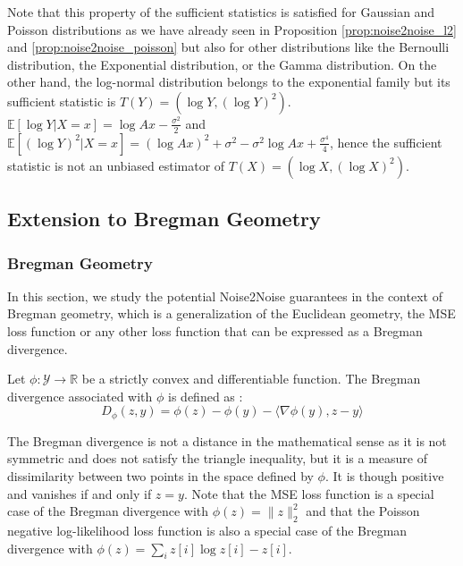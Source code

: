 \noindent Note that this property of the sufficient statistics is satisfied for Gaussian and Poisson distributions as we have already seen in Proposition \ref{prop:noise2noise_l2} and \ref{prop:noise2noise_poisson}
but also for other distributions like the Bernoulli distribution, the Exponential distribution, or the Gamma distribution.
On the other hand, the log-normal distribution belongs to the exponential family but its sufficient statistic is $T(Y) = (\log Y, (\log Y)^2)$.
$\mathbb{E}[\log Y | X=x] = \log Ax - \frac{\sigma^2}{2}$ and $\mathbb{E}[(\log Y)^2 | X=x] = (\log Ax)^2 + \sigma^2 - \sigma^2 \log Ax + \frac{\sigma^4}{4}$, hence the sufficient statistic is not an unbiased estimator of $T(X) = (\log X, (\log X)^2)$.


\subsection{Extension to Bregman Geometry}

\subsubsection{Bregman Geometry}

In this section, we study the potential Noise2Noise guarantees in the context of Bregman geometry, which is a generalization of the Euclidean geometry, the MSE loss function or any other loss function that can be expressed as a Bregman divergence.
\begin{definition}
Let $\phi: \mathcal{Y} \to \mathbb{R}$ be a strictly convex and differentiable function. The Bregman divergence associated with $\phi$ is defined as :
\begin{equation}
    \label{bregman_divergence}
    D_\phi(z, y) = \phi(z) - \phi(y) - \langle \nabla \phi(y), z - y \rangle
\end{equation}
\end{definition}
\noindent The Bregman divergence is not a distance in the mathematical sense as it is not symmetric and does not satisfy the triangle inequality, but it is a measure of dissimilarity between two points in the space defined by $\phi$.
It is though positive and vanishes if and only if $z = y$.
Note that the MSE loss function is a special case of the Bregman divergence with $\phi(z) = \| z \|_2^2$ and that the Poisson negative log-likelihood loss function is also a special case of the Bregman divergence with $\phi(z) = \sum_i z[i] \log z[i] - z[i]$.

